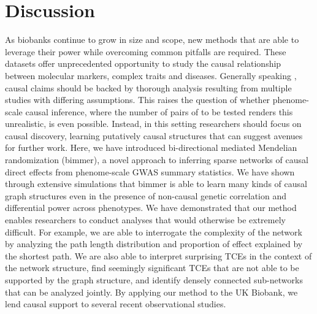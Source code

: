 \documentclass{article}
\begin{document}
\section{Discussion}\label{discussion}
As biobanks continue to grow in size and scope, new methods that are able to
leverage their power while overcoming common pitfalls are required.
These datasets offer unprecedented opportunity to study
the causal relationship between molecular markers, complex traits and diseases.
Generally speaking , causal claims should be backed by thorough analysis resulting from
multiple studies with differing assumptions. This raises the question
of whether phenome-scale causal inference, where the number of pairs of to be tested
renders this unrealistic, is even possible. Instead, in this setting researchers should focus on
causal discovery, learning putatively causal structures that can suggest avenues for further
work.
Here, we have introduced bi-directional mediated Mendelian randomization (bimmer),
a novel approach to inferring sparse networks of causal direct effects from phenome-scale
GWAS summary statistics. We have shown through extensive simulations that
bimmer is able to learn many kinds of causal graph structures even in the presence
of non-causal genetic correlation and differential power across phenotypes.
We have demonstrated that our method enables researchers to conduct 
analyses that would otherwise be extremely difficult. For example, 
we are able to interrogate the complexity of the network by analyzing the path length
distribution and proportion of effect explained by the shortest path. We are also able to 
interpret surprising TCEs in the context of the network structure, find seemingly
significant TCEs that are not able to be supported by the graph structure, and
identify densely connected sub-networks that can be analyzed jointly. By applying our
method to the UK Biobank, we lend causal support to several recent observational studies.
\end{document}

